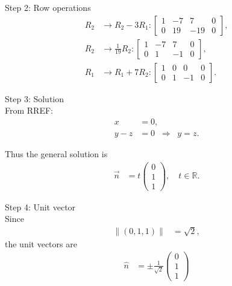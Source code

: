 \documentclass{beamer}
\begin{document}
\begin{frame}
    

Step 2: Row operations\\
\begin{align}
R_2 &\to R_2 - 3R_1: 
\left[\begin{array}{ccc|c}
1 & -7 & 7 & 0\\
0 & 19 & -19 & 0
\end{array}\right], \label{eq:row1}\\[6pt]
R_2 &\to \tfrac{1}{19}R_2: 
\left[\begin{array}{ccc|c}
1 & -7 & 7 & 0\\
0 & 1 & -1 & 0
\end{array}\right], \label{eq:row2}\\[6pt]
R_1 &\to R_1 + 7R_2: 
\left[\begin{array}{ccc|c}
1 & 0 & 0 & 0\\
0 & 1 & -1 & 0
\end{array}\right]. \label{eq:row3}
\end{align}

Step 3: Solution\\
From RREF:
\begin{align}
x &= 0, \label{eq:x0}\\
y - z &= 0 \;\;\Rightarrow\;\; y=z. \label{eq:yz}
\end{align}
\end{frame}
\begin{frame}
Thus the general solution is
\begin{align}
\vec{n} &= t\begin{pmatrix}0\\1\\1\end{pmatrix}, \quad t\in\mathbb{R}. \label{eq:gensol}
\end{align}

Step 4: Unit vector\\
Since 
\begin{align}
\|(0,1,1)\| &= \sqrt{2}, \label{eq:norm}
\end{align}
the unit vectors are
\begin{align}
\hat{n} &= \pm \frac{1}{\sqrt{2}}\begin{pmatrix}0\\1\\1\end{pmatrix} \label{eq:unit1}\\

\end{align}


\end{frame}
\end{document}
